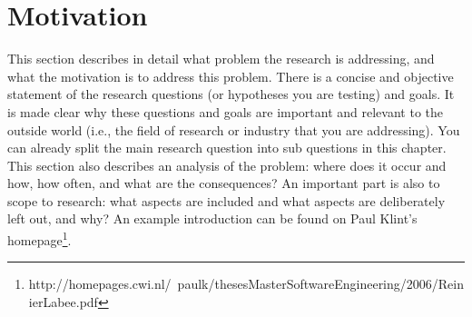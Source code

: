 \chapter{Motivation}
This section describes in detail what problem the research is addressing, and
what the motivation is to address this problem.
There is a concise and objective statement of the research questions (or
hypotheses you are testing) and goals. It is made clear why these questions and
goals are important and relevant to the outside world (i.e., the field of
research or industry that you are addressing). You can already split the main
research question into sub questions in this chapter.
This section also describes an analysis of the problem: where does it occur and
how, how often, and what are the consequences? An important part is also to
scope to research: what aspects are included and what aspects are deliberately
left out, and why? An example introduction can be found on Paul Klint’s
homepage\footnote{http://homepages.cwi.nl/~paulk/thesesMasterSoftwareEngineering/2006/ReinierLabee.pdf}.

